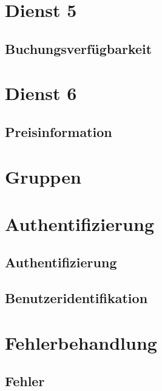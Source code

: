 \section{Dienst 5}
\label{subsec:Datenmodell:Dienst5}

\subsection*{Buchungsverfügbarkeit}



\section{Dienst 6}
\label{subsec:Datenmodell:Dienst6}

\subsection*{Preisinformation}


\section{Gruppen}



\section{Authentifizierung}
\subsection*{Authentifizierung}


\subsection*{Benutzeridentifikation}


\section{Fehlerbehandlung}
\subsection*{Fehler}


